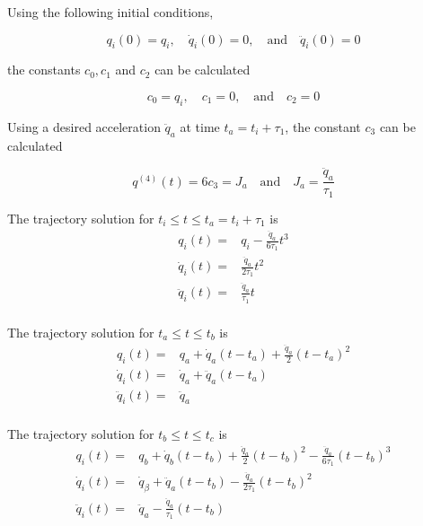 Using the following initial conditions, 

\begin{equation}
q_i(0) = q_i, \quad \dot{q}_i(0) = 0, \quad \textrm{and} \quad \ddot{q}_i(0) = 0
\end{equation}

the constants $c_0,c_1$ and $c_2$ can be calculated

\begin{equation}
c_0 = q_i, \quad c_1 = 0, \quad \textrm{and} \quad c_2 = 0
\end{equation}

Using a desired acceleration $\ddot{q}_a$ at time $t_a = t_i + τ_1$, the constant $c_3$ can be calculated

\begin{equation}
q^{(4)}(t) = 6c_3 = J_a \quad \textrm{and} \quad J_a = \frac{\ddot{q}_a}{τ_1}
\end{equation}

The trajectory solution for $t_i \leq t \leq t_a = t_i + τ_1$ is
\begin{equation}
\begin{aligned}
q_i(t) ={}& q_i - \frac{\ddot{q}_{a}}{6τ_1}t^3 \\
\dot{q}_i(t) ={}& \frac{\ddot{q}_{a}}{2τ_1}t^2 \\
\ddot{q}_i(t) ={}& \frac{\ddot{q}_{a}}{τ_1}t \\
\end{aligned}
\end{equation}

The trajectory solution for $t_a \leq t \leq t_b$ is
\begin{equation}
\begin{aligned}
q_i(t) ={}& q_a + \dot{q}_a(t-t_a) + \frac{\ddot{q}_a}{2}(t-t_a)^2 \\
\dot{q}_i(t) ={}& \dot{q}_a + \ddot{q}_a(t-t_a) \\
\ddot{q}_i(t) ={}& \ddot{q}_a \\
\end{aligned}
\end{equation}

The trajectory solution for $t_b \leq t \leq t_c$ is
\begin{equation}
\begin{aligned}
q_i(t) ={}& q_b + \dot{q}_b(t-t_b) + \frac{\ddot{q}_a}{2}(t-t_b)^2 - \frac{\ddot{q}_a}{6τ_1}(t-t_b)^3 \\
\dot{q}_i(t) ={}& \dot{q}_β + \ddot{q}_a(t-t_b) - \frac{\ddot{q}_a}{2τ_1}(t-t_b)^2 \\
\ddot{q}_i(t) ={}& \ddot{q}_a - \frac{\ddot{q}_a}{τ_1}(t-t_b) \\
\end{aligned}
\end{equation}

